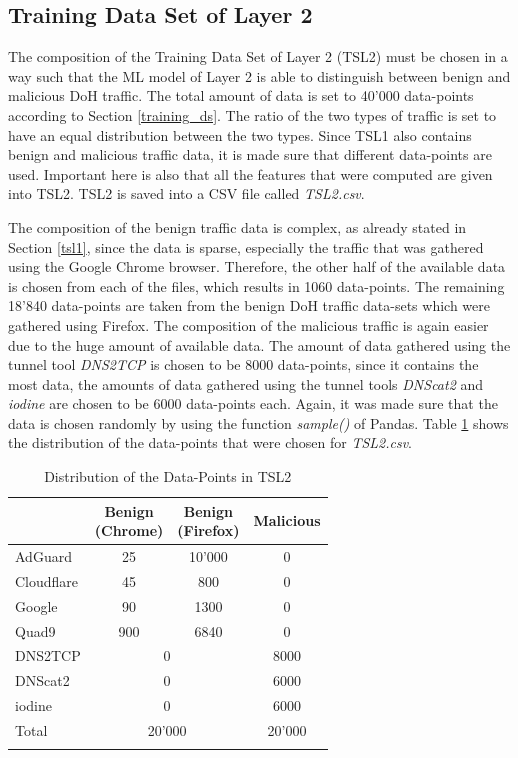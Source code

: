 \subsection{Training Data Set of Layer 2} \label{tsl2}
The composition of the Training Data Set of Layer 2 (TSL2) must be chosen in a way such that the ML model of Layer 2 is able to distinguish between benign and malicious DoH traffic. The total amount of data is set to 40'000 data-points according to Section \ref{training_ds}. The ratio of the two types of traffic is set to have an equal distribution between the two types. Since TSL1 also contains benign and malicious traffic data, it is made sure that different data-points are used. Important here is also that all the features that were computed are given into TSL2. TSL2 is saved into a CSV file called \textit{TSL2.csv}.

The composition of the benign traffic data is complex, as already stated in Section \ref{tsl1}, since the data is sparse, especially the traffic that was gathered using the Google Chrome browser. Therefore, the other half of the available data is chosen from each of the files, which results in 1060 data-points. The remaining 18'840 data-points are taken from the benign DoH traffic data-sets which were gathered using Firefox. The composition of the malicious traffic is again easier due to the huge amount of available data. The amount of data gathered using the tunnel tool \textit{DNS2TCP} is chosen to be 8000 data-points, since it contains the most data, the amounts of data gathered using the tunnel tools \textit{DNScat2} and \textit{iodine} are chosen to be 6000 data-points each. Again, it was made sure that the data is chosen randomly by using the function \textit{sample()} of Pandas. Table \ref{tab:tsl2} shows the distribution of the data-points that were chosen for \textit{TSL2.csv}.

\begin{center}
\begin{longtable}{ |l|c|c|c| }
\hline
& \makecell{Benign\\(Chrome)} & \makecell{Benign\\(Firefox)} & Malicious \\
\hline
AdGuard & 25 & 10'000 & 0 \\
Cloudflare & 45 & 800 & 0 \\
Google & 90 & 1300 & 0 \\
Quad9 & 900 & 6840 & 0 \\
\hline
DNS2TCP & \multicolumn{2}{|c|}{0} & 8000 \\
DNScat2 & \multicolumn{2}{|c|}{0} & 6000 \\
iodine & \multicolumn{2}{|c|}{0} & 6000 \\
\hline
Total & \multicolumn{2}{|c|}{20'000} & 20'000 \\ 
\hline
\caption{Distribution of the Data-Points in TSL2}
\label{tab:tsl2}
\end{longtable}
\end{center}

